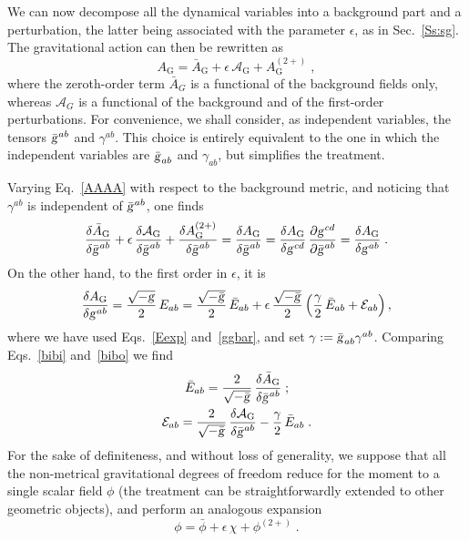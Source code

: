 \documentclass[a4paper,showkeys,aps,prd,reprint,nofootinbib,showpacs,twocolumn]{revtex4-1}
\newcommand{\ton}[1]{\left(#1\right)}
\newcommand{\subeq}[1]{\begin{subequations} #1 \end{subequations}}
\newcommand{\eq}[1]{\( #1 \)}
\newcommand{\eqd}[1]{\begin{equation} #1 \end{equation}}
\newcommand{\gat}[1]{\begin{gather} #1 \end{gather}}
\newcommand{\Cal}[1]{\mathcal{#1}}
\newcommand{\matg}{\text{\textsl{g}}}%
\theoremstyle{plain}
\begin{document}
We can now decompose all the dynamical variables into a background part and a perturbation, the latter being associated with the parameter \eq{\epsilon}, as in Sec.~\ref{Ss:sg}.  The gravitational action can then be rewritten as 
%
\eqd{A_{\text{G}} = \bar{A}_{\text{G}} + \epsilon \, \Cal{A}_{\text{G}} + A_{\text{G}}^{(2+)}\;,
\label{AAAA}}
%
where the zeroth-order term \eq{\bar{A}_G} is a functional of the background fields only, whereas \eq{\Cal{A}_G} is a functional of the background and of the first-order perturbations.  For convenience, we shall consider, as independent variables, the tensors \eq{\bar{\matg}^{ab}} and \eq{\gamma^{ab}}.  This choice is entirely equivalent to the one in which the independent variables are \eq{\bar{\matg}_{ab}} and \eq{\gamma_{ab}}, but simplifies the treatment.

Varying Eq.~\eqref{AAAA} with respect to the background metric, and noticing that \eq{\gamma^{ab}} is independent of \eq{\bar{\matg}^{ab}}, one finds
%
\eqd{\frac{\delta \bar{A}_{\text{G}}}{\delta \bar{\matg}^{ab}} + \epsilon \, \frac{\delta \Cal{A}_{\text{G}}}{\delta \bar{\matg}^{ab}} + \frac{\delta A^{(2+)}_{\text{G}}}{\delta \bar{\matg}^{ab}} = \frac{\delta A_{\text{G}}}{\delta \bar{\matg}^{ab}} = \frac{\delta A_{\text{G}}}{\delta \matg^{cd}} \, \frac{\partial \matg^{cd}}{\partial\bar{\matg}^{ab}} = \frac{\delta A_{\text{G}}}{\delta \matg^{ab}} \;.\label{bibi}} 
%
On the other hand, to the first order in \eq{\epsilon}, it is
%
\eqd{\frac{\delta A_{\text{G}}}{\delta \matg^{ab}} = \frac{\sqrt{-\matg}}{2} \, E_{ab} = \frac{\sqrt{-\bar{\matg}}}{2} \, \bar{E}_{ab} + \epsilon \, \frac{\sqrt{-\bar{\matg}}}{2} \ton{\frac{\gamma}{2} \, \bar{E}_{ab} + \Cal{E}_{ab}} , \label{bibo}}
%
where we have used Eqs.~\eqref{Eexp} and~\eqref{ggbar}, and set \eq{\gamma := \bar{\matg}_{ab} \gamma^{ab}}.  Comparing Eqs.~\eqref{bibi} and~\eqref{bibo} we find
%
\subeq{\gat{\bar{E}_{ab} = \frac{2}{\sqrt{- \bar{\matg}}} \, \frac{\delta \bar{A}_{\text{G}}}{\delta \bar{\matg}^{ab}} \;;\\
\Cal{E}_{ab} = \frac{2}{\sqrt{-\bar{\matg}}} \, \frac{\delta \Cal{A}_{\text{G}}}{\delta \bar{\matg}^{ab}} - \frac{\gamma}{2}\,\bar{E}_{ab}\;.
\label{chicchirichi}}}
%
For the sake of definiteness, and without loss of generality, we suppose that all the non-metrical gravitational degrees of freedom reduce for the moment to a single scalar field \eq{\phi} (the treatment can be straightforwardly  extended to other geometric objects), and perform an analogous expansion
%
\eqd{\phi = \bar{\phi} + \epsilon\,\chi + \phi^{(2+)} \;.
\label{eq:phiexp}}
\end{document}
